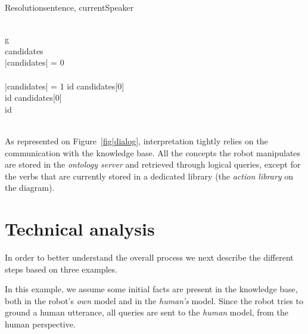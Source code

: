 \small
\begin{pseudocode}[ruled]{Resolution}{sentence, currentSpeaker}
\label{algo|Resolution}

 \GETS {} \\

\FOREACH g \in {} \DO 
\BEGIN
    \GETS {} \\
   candidates \GETS {} \\
   
   \IF \left|{candidates}\right| = 0 \THEN
    \BEGIN
       \\
      \EXIT \\
    \END
   \ELSEIF \left|{candidates}\right| = 1 \THEN
      id \GETS candidates[0] \\

   \ELSE
      \BEGIN
	\IF {} \THEN
	  id \GETS candidates[0] \\
	\ELSE
	  id \GETS {} \\ %
      \END \\
\END
\end{pseudocode}
\normalsize

As represented on Figure~\ref{fig|dialog}, interpretation tightly relies on the
communication with the knowledge base. All the concepts the robot manipulates
are stored in the \textit{ontology server} and retrieved through logical
queries, except for the verbs that are currently stored in a dedicated library
(the \emph{action library} on the diagram).

\section{Technical analysis}
\label{examples}

In order to better understand the overall process we next describe the
different steps based on three examples.

In this example, we assume some initial facts are present in the knowledge
base, both in the robot's \emph{own} model and in the \emph{human's} model.
Since the robot tries to ground a human utterance, all queries are sent 
to the \emph{human} model, \ie from the human perspective. 

